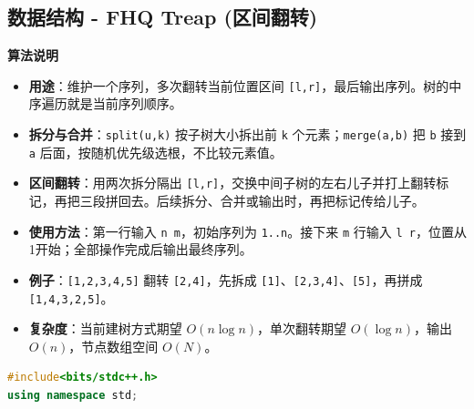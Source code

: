 \documentclass[10pt,landscape,a4paper]{article}
\begin{document}
\begin{multicols*}{3}
\subsection*{数据结构 - FHQ Treap (区间翻转)}
\par\addvspace{0.7ex}\noindent\textbf{算法说明}\par\nobreak
\begin{itemize}
\item \textbf{用途}：维护一个序列，多次翻转当前位置区间 \texttt{[\allowbreak{}l\allowbreak{},\allowbreak{}r\allowbreak{}]}，最后输出序列。树的中序遍历就是当前序列顺序。
\item \textbf{拆分与合并}：\texttt{s\allowbreak{}p\allowbreak{}l\allowbreak{}i\allowbreak{}t\allowbreak{}(\allowbreak{}u\allowbreak{},\allowbreak{}k\allowbreak{})} 按子树大小拆出前 \texttt{k} 个元素；\texttt{m\allowbreak{}e\allowbreak{}r\allowbreak{}g\allowbreak{}e\allowbreak{}(\allowbreak{}a\allowbreak{},\allowbreak{}b\allowbreak{})} 把 \texttt{b} 接到 \texttt{a} 后面，按随机优先级选根，不比较元素值。
\item \textbf{区间翻转}：用两次拆分隔出 \texttt{[\allowbreak{}l\allowbreak{},\allowbreak{}r\allowbreak{}]}，交换中间子树的左右儿子并打上翻转标记，再把三段拼回去。后续拆分、合并或输出时，再把标记传给儿子。
\item \textbf{使用方法}：第一行输入 \texttt{n\allowbreak{} \allowbreak{}m}，初始序列为 \texttt{1\allowbreak{}.\allowbreak{}.\allowbreak{}n}。接下来 \texttt{m} 行输入 \texttt{l\allowbreak{} \allowbreak{}r}，位置从1开始；全部操作完成后输出最终序列。
\item \textbf{例子}：\texttt{[\allowbreak{}1\allowbreak{},\allowbreak{}2\allowbreak{},\allowbreak{}3\allowbreak{},\allowbreak{}4\allowbreak{},\allowbreak{}5\allowbreak{}]} 翻转 \texttt{[\allowbreak{}2\allowbreak{},\allowbreak{}4\allowbreak{}]}，先拆成 \texttt{[\allowbreak{}1\allowbreak{}]}、\texttt{[\allowbreak{}2\allowbreak{},\allowbreak{}3\allowbreak{},\allowbreak{}4\allowbreak{}]}、\texttt{[\allowbreak{}5\allowbreak{}]}，再拼成 \texttt{[\allowbreak{}1\allowbreak{},\allowbreak{}4\allowbreak{},\allowbreak{}3\allowbreak{},\allowbreak{}2\allowbreak{},\allowbreak{}5\allowbreak{}]}。
\item \textbf{复杂度}：当前建树方式期望 $O(n\log n)$，单次翻转期望 $O(\log n)$，输出 $O(n)$，节点数组空间 $O(N)$。
\end{itemize}
\par{}\par
\begin{lstlisting}[language=C++]
#include<bits/stdc++.h>
using namespace std;


\end{lstlisting}
\end{multicols*}
\end{document}
